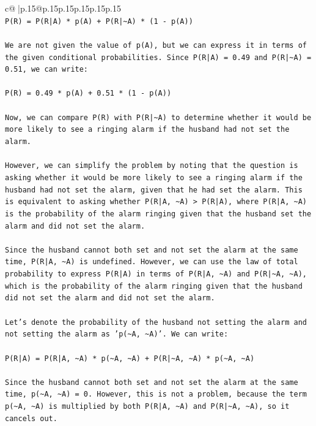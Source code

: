 \documentclass{article}
\begin{document}
{\begin{supertabular}{c@{$\;$}|p{.15\linewidth}@{}p{.15\linewidth}p{.15\linewidth}p{.15\linewidth}p{.15\linewidth}p{.15\linewidth}}
{{{\\ 
\texttt{P(R) = P(R|A) * p(A) + P(R|\textasciitilde{}A) * (1 {-} p(A))} \\
\\ 
\texttt{We are not given the value of p(A), but we can express it in terms of the given conditional probabilities. Since P(R|A) = 0.49 and P(R|\textasciitilde{}A) = 0.51, we can write:} \\
\\ 
\texttt{P(R) = 0.49 * p(A) + 0.51 * (1 {-} p(A))} \\
\\ 
\texttt{Now, we can compare P(R) with P(R|\textasciitilde{}A) to determine whether it would be more likely to see a ringing alarm if the husband had not set the alarm.} \\
\\ 
\texttt{However, we can simplify the problem by noting that the question is asking whether it would be more likely to see a ringing alarm if the husband had not set the alarm, given that he had set the alarm. This is equivalent to asking whether P(R|A, \textasciitilde{}A) > P(R|A), where P(R|A, \textasciitilde{}A) is the probability of the alarm ringing given that the husband set the alarm and did not set the alarm.} \\
\\ 
\texttt{Since the husband cannot both set and not set the alarm at the same time, P(R|A, \textasciitilde{}A) is undefined. However, we can use the law of total probability to express P(R|A) in terms of P(R|A, \textasciitilde{}A) and P(R|\textasciitilde{}A, \textasciitilde{}A), which is the probability of the alarm ringing given that the husband did not set the alarm and did not set the alarm.} \\
\\ 
\texttt{Let's denote the probability of the husband not setting the alarm and not setting the alarm as 'p(\textasciitilde{}A, \textasciitilde{}A)'. We can write:} \\
\\ 
\texttt{P(R|A) = P(R|A, \textasciitilde{}A) * p(\textasciitilde{}A, \textasciitilde{}A) + P(R|\textasciitilde{}A, \textasciitilde{}A) * p(\textasciitilde{}A, \textasciitilde{}A)} \\
\\ 
\texttt{Since the husband cannot both set and not set the alarm at the same time, p(\textasciitilde{}A, \textasciitilde{}A) = 0. However, this is not a problem, because the term p(\textasciitilde{}A, \textasciitilde{}A) is multiplied by both P(R|A, \textasciitilde{}A) and P(R|\textasciitilde{}A, \textasciitilde{}A), so it cancels out.} \\
}}}
\end{supertabular}}
\end{document}
